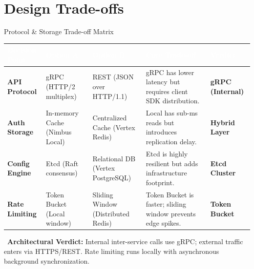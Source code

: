 
\section{Design Trade-offs}

\begin{frame}{Protocol \& Storage Trade-off Matrix}
  \fontsize{8}{10}\selectfont
  \renewcommand{\arraystretch}{0.9}
  \begin{tabularx}{\textwidth}{l X X X l}
    \rowcolor{primary}
    \textcolor{white}{\textbf{Decision Point}} & 
    \textcolor{white}{\textbf{Option A}} & 
    \textcolor{white}{\textbf{Option B}} & 
    \textcolor{white}{\textbf{Core Trade-off}} & 
    \textcolor{white}{\textbf{Verdict}} \\
    \midrule
    
    \textbf{API Protocol} & 
    gRPC \newline (HTTP/2 multiplex) & 
    REST \newline (JSON over HTTP/1.1) & 
    gRPC has lower latency but requires client SDK distribution. & 
    \textcolor{secondary}{\textbf{gRPC (Internal)}} \\
    \arrayrulecolor{neutral-dark!30}\hline
    
    \textbf{Auth Storage} & 
    In-memory Cache \newline (Nimbus Local) & 
    Centralized Cache \newline (Vertex Redis) & 
    Local has sub-ms reads but introduces replication delay. & 
    \textcolor{secondary}{\textbf{Hybrid Layer}} \\
    \arrayrulecolor{neutral-dark!30}\hline
    
    \textbf{Config Engine} & 
    Etcd \newline (Raft consensus) & 
    Relational DB \newline (Vertex PostgreSQL) & 
    Etcd is highly resilient but adds infrastructure footprint. & 
    \textcolor{secondary}{\textbf{Etcd Cluster}} \\
    \arrayrulecolor{neutral-dark!30}\hline
    
    \textbf{Rate Limiting} & 
    Token Bucket \newline (Local window) & 
    Sliding Window \newline (Distributed Redis) & 
    Token Bucket is faster; sliding window prevents edge spikes. & 
    \textcolor{secondary}{\textbf{Token Bucket}} \\
    \bottomrule
  \end{tabularx}

  \vspace{0.2cm}
  \begin{center}
    \scriptsize
    \textcolor{accent}{\faInfoCircle\ \textbf{Architectural Verdict:} Internal inter-service calls use gRPC; external traffic enters via HTTPS/REST. Rate limiting runs locally with asynchronous background synchronization.}
  \end{center}
\end{frame}

